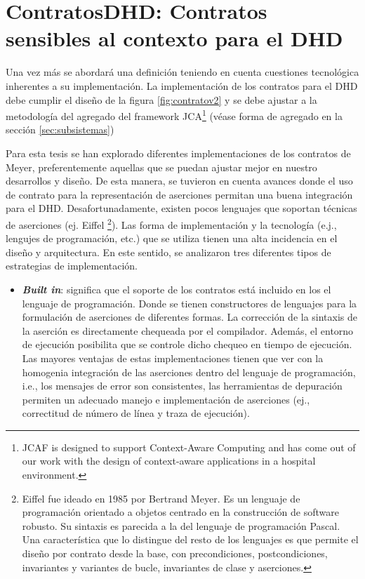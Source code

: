 {\begin{itemize}
\end{itemize}




\section{ContratosDHD: Contratos sensibles al contexto para el DHD}
\label{sec:estrategiasca}


Una vez más se abordará una definición teniendo en cuenta cuestiones
tecnológica inherentes a su implementación. La implementación
de los contratos para el DHD debe cumplir el dise\~no de la figura \ref{fig:contratov2} y se debe ajustar a la metodología del agregado del framework JCA\footnote{JCAF is designed to support Context-Aware Computing and has come out of our work with the design of context-aware applications in a hospital environment.} (véase forma de agregado en la sección \ref{sec:subsistemas})
 


Para esta tesis se han explorado diferentes implementaciones de los contratos de Meyer, preferentemente aquellas que se puedan ajustar mejor en nuestro desarrollos y dise\~no. De esta manera, se tuvieron en cuenta avances donde el uso de contrato para la representación de aserciones permitan una buena integración para el DHD. Desafortunadamente, existen pocos lenguajes que soportan técnicas de aserciones (ej. Eiffel \footnote{Eiffel fue ideado en 1985 por Bertrand Meyer. Es un lenguaje de programación orientado a objetos centrado en la construcción de software robusto. Su sintaxis es parecida a la del lenguaje de programación Pascal. Una característica que lo distingue del resto de los lenguajes es que permite el diseño por contrato desde la base, con precondiciones, postcondiciones, invariantes y variantes de bucle, invariantes de clase y aserciones.}). Las forma de implementación y la tecnología (e.j., lengujes de programación, etc.) que se utiliza tienen una alta incidencia en el dise\~no y arquitectura. En este sentido, se analizaron tres diferentes tipos de estrategias de implementación.

\begin{itemize}
 \item \textbf{\textit{Built in}}: significa que el soporte de los contratos está
incluido en los el lenguaje de programación. Donde se tienen constructores de lenguajes para
la formulación de aserciones de diferentes formas. La corrección de la
sintaxis de la aserción es directamente chequeada por el compilador. Además,
el entorno de ejecución posibilita que se controle dicho chequeo en tiempo de
ejecución. Las mayores ventajas de estas implementaciones tienen que ver con la
homogenia integración de las aserciones dentro del lenguaje de
programación, i.e., los mensajes de error son consistentes, las herramientas de depuración
permiten un adecuado manejo e implementación de aserciones (ej., correctitud de número de línea y traza de ejecución).



\end{itemize}}
